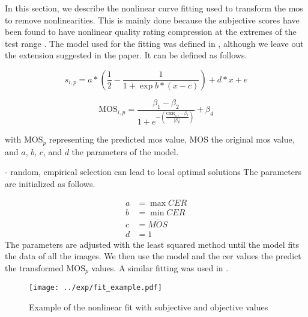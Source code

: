 In this section, we describe the nonlinear curve fitting used to transform the \gls{mos} to remove nonlinearities.
This is mainly done because the subjective scores have been found to have nonlinear quality rating compression at the extremes of the test range \cite{nonlin_fit_original_2000}.
The model used for the fitting was defined in \cite{nonlin_fit_original_2000}, although we leave out the extension suggested in the paper.
It can be defined as follows.

\begin{equation}
    s_{i,p} = a * (\frac{1}{2} - \frac{1}{1 + \exp{b * (x - c)}}) + d * x + e
    \label{eq:nonlinear}
\end{equation}

\begin{equation}
    \textrm{MOS}_{i,p} = \frac{\beta_{1}-\beta_{2}}{1 + e^{-\left(\frac{\textrm{CER}_{c,i}-\beta_{3}}{|\beta_{4}|}\right)}} + \beta_{4}
\end{equation}

with $\text{MOS}_{p}$ representing the predicted \gls{mos} value, $\text{MOS}$ the original \gls{mos} value, and $a$, $b$, $c$, and $d$ the parameters of the model.

- random, empirical selection can lead to local optimal solutions
The parameters are initialized as follows.
 
\begin{equation}
    \begin{aligned}
        a &= \max{CER} \\
        b &= \min{CER} \\
        c &= \overline{MOS} \\
        d &= 1
    \end{aligned}
    \label{eq:nonlinear_init}
\end{equation}
The parameters are adjusted with the least squared method until the model fits the data of all the images.
We then use the model and the \gls{cer} values the predict the transformed $\text{MOS}_{p}$ values.
A similar fitting was used in \cite{nonlin_fit_2011}\cite{nonlin_fit_appl_2017}.

\begin{figure}[h]
    \centering
    \texttt{[image: ../exp/fit\_example.pdf]}
    \caption{Example of the nonlinear fit with subjective and objective values}
    \label{fig:nonlinear_fit}
\end{figure}

